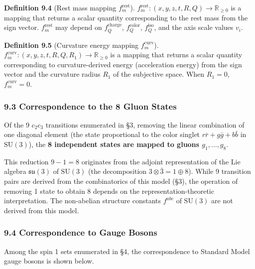 \documentclass[
  a4paper,11pt]{article}
\theoremstyle{definition}
\theoremstyle{remark}
\begin{document}
\textbf{Definition 9.4} (Rest mass mapping \(f_m^{\text{rest}}\)).
\(f_m^{\text{rest}}: (x, y, z, t, R, Q) \to \mathbb{R}_{\geq 0}\) is a
mapping that returns a scalar quantity corresponding to the rest mass
from the sign vector. \(f_m^{\text{rest}}\) may depend on
\(f_Q^{\text{charge}}\), \(f_Q^{\text{color}}\), \(f_Q^{\text{iso}}\),
and the axis scale values \(v_i\).

\textbf{Definition 9.5} (Curvature energy mapping
\(f_m^{\text{curv}}\)).
\(f_m^{\text{curv}}: (x, y, z, t, R, Q, R_1) \to \mathbb{R}_{\geq 0}\)
is a mapping that returns a scalar quantity corresponding to
curvature-derived energy (acceleration energy) from the sign vector and
the curvature radius \(R_1\) of the subjective space. When \(R_1 = 0\),
\(f_m^{\text{curv}} = 0\).

\subsubsection{9.3 Correspondence to the 8 Gluon
States}\label{correspondence-to-the-8-gluon-states}

Of the 9 \(c_2 c_3\) transitions enumerated in §3, removing the linear
combination of one diagonal element (the state proportional to the color
singlet \(r\bar{r} + g\bar{g} + b\bar{b}\) in \(\mathrm{SU}(3)\)), the
\textbf{8 independent states are mapped to gluons \(g_1, \ldots, g_8\)}.

This reduction \(9 - 1 = 8\) originates from the adjoint representation
of the Lie algebra \(\mathfrak{su}(3)\) of \(\mathrm{SU}(3)\) (the
decomposition \(3 \otimes \bar{3} = 1 \oplus 8\)). While 9 transition
pairs are derived from the combinatorics of this model (§3), the
operation of removing 1 state to obtain 8 depends on the
representation-theoretic interpretation. The non-abelian structure
constants \(f^{abc}\) of \(\mathrm{SU}(3)\) are not derived from this
model.

\subsubsection{9.4 Correspondence to Gauge
Bosons}\label{correspondence-to-gauge-bosons}

Among the spin 1 sets enumerated in §4, the correspondence to Standard
Model gauge bosons is shown below.
\end{document}
